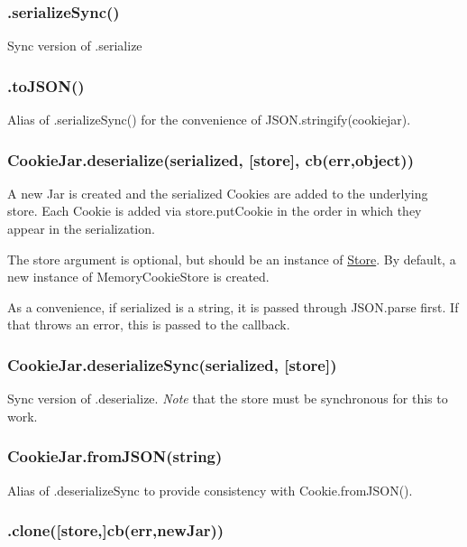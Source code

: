 \subsubsection*{{\ttfamily .serialize\+Sync()}}

Sync version of .serialize

\subsubsection*{{\ttfamily .to\+J\+S\+O\+N()}}

Alias of .serialize\+Sync() for the convenience of {\ttfamily J\+S\+O\+N.\+stringify(cookiejar)}.

\subsubsection*{{\ttfamily Cookie\+Jar.\+deserialize(serialized, \mbox{[}store\mbox{]}, cb(err,object))}}

A new Jar is created and the serialized Cookies are added to the underlying store. Each {\ttfamily Cookie} is added via {\ttfamily store.\+put\+Cookie} in the order in which they appear in the serialization.

The {\ttfamily store} argument is optional, but should be an instance of {\ttfamily \hyperlink{class_store}{Store}}. By default, a new instance of {\ttfamily Memory\+Cookie\+Store} is created.

As a convenience, if {\ttfamily serialized} is a string, it is passed through {\ttfamily J\+S\+O\+N.\+parse} first. If that throws an error, this is passed to the callback.

\subsubsection*{{\ttfamily Cookie\+Jar.\+deserialize\+Sync(serialized, \mbox{[}store\mbox{]})}}

Sync version of {\ttfamily .deserialize}. {\itshape Note} that the {\ttfamily store} must be synchronous for this to work.

\subsubsection*{{\ttfamily Cookie\+Jar.\+from\+J\+S\+O\+N(string)}}

Alias of {\ttfamily .deserialize\+Sync} to provide consistency with {\ttfamily Cookie.\+from\+J\+S\+O\+N()}.

\subsubsection*{{\ttfamily .clone(\mbox{[}store,\mbox{]}cb(err,new\+Jar))}}

